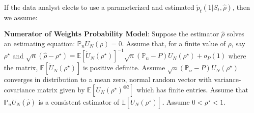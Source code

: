 \documentclass[12pt]{article}
\def\E{\mathbb{E}}
\def\P{\mathbb{P}}
\begin{document}
If the data analyst elects to use a parameterized and estimated $\tilde p_t(1|S_t,\hat \rho)$, then we assume:

\textbf{Numerator of Weights Probability Model}: Suppose the estimator $\hat\rho$ solves an estimating equation: $\P_n U_N(\rho)=0$. Assume that, for a finite value of $\rho$, say $\rho^\star$ and $\sqrt{n}(\hat\rho-\rho^\star)= \E \left[\dot U_N (\rho^\star) \right]^{-1}\sqrt{n}(\P_n-P) U_N (\rho^\star) + o_P(1)$ where the matrix, $\E \left[\dot U_N (\rho^\star) \right]$ is positive definite. Assume $\sqrt{n}(\P_n-P) U_N (\rho^\star)$ converges in distribution to a mean zero, normal random vector with variance-covariance matrix given by $\E[U_N(\rho^\star)^ {\otimes 2}]$ which has finite entries. Assume that $\P_n \dot U_N(\hat\rho)$ is a consistent estimator of $\E[\dot U_N(\rho^\star)]$. Assume $0 <\rho^\star <1$.
\end{document}
